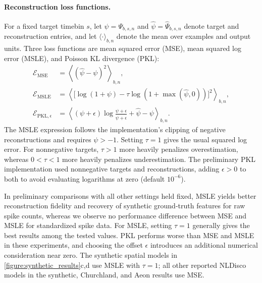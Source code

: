 \paragraph{Reconstruction loss functions.}
\label{paragraph:reconstruction_loss_functions}
For a fixed target timebin $s$, let $\psi=\Psi_{b,s,n}$ and $\hat{\psi}=\hat{\Psi}_{b,s,n}$ denote target and reconstruction entries, and let $\langle\cdot\rangle_{b,n}$ denote the mean over examples and output units. Three loss functions are mean squared error (MSE), mean squared log error (MSLE), and Poisson KL divergence (PKL):
\begin{align}
\mathcal{E}_{\mathrm{MSE}} &= \left\langle(\hat{\psi}-\psi)^2\right\rangle_{b,n},\\
\mathcal{E}_{\mathrm{MSLE}} &= \left\langle\bigl[\log(1+\psi)-\tau\log(1+\max(\hat{\psi},0))\bigr]^2\right\rangle_{b,n},\\
\mathcal{E}_{\mathrm{PKL},\epsilon} &= \left\langle(\psi+\epsilon)\log\!\frac{\psi+\epsilon}{\hat{\psi}+\epsilon}+\hat{\psi}-\psi\right\rangle_{b,n}.
\end{align}
The MSLE expression follows the implementation's clipping of negative reconstructions and requires $\psi>-1$. Setting $\tau=1$ gives the usual squared log error. For nonnegative targets, $\tau>1$ more heavily penalizes overestimation, whereas $0<\tau<1$ more heavily penalizes underestimation. The preliminary PKL implementation used nonnegative targets and reconstructions, adding $\epsilon>0$ to both to avoid evaluating logarithms at zero (default $10^{-6}$).

In preliminary comparisons with all other settings held fixed, MSLE yields better reconstruction fidelity and recovery of synthetic ground-truth features for raw spike counts, whereas we observe no performance difference between MSE and MSLE for standardized spike data. For MSLE, setting $\tau=1$ generally gives the best results among the tested values. PKL performs worse than MSE and MSLE in these experiments, and choosing the offset $\epsilon$ introduces an additional numerical consideration near zero. The synthetic spatial models in \autoref{figure:synthetic_results}c,d use MSLE with $\tau=1$; all other reported NLDisco models in the synthetic, Churchland, and Aeon results use MSE.

